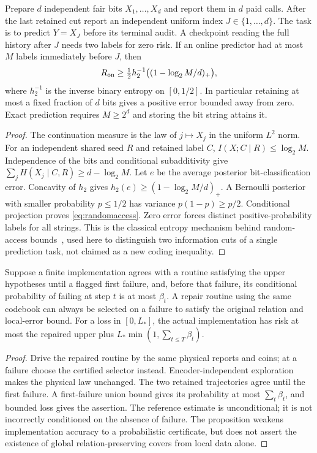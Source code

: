 \begin{example}\label{ex:query}
Prepare $d$ independent fair bits $X_1,\ldots,X_d$ and report them in $d$ paid calls. After the last retained cut report an independent uniform index $J\in\{1,\ldots,d\}$. The task is to predict $Y=X_J$ before its terminal audit. A checkpoint reading the full history after $J$ needs two labels for zero risk. If an online predictor had at most $M$ labels immediately before $J$, then
\begin{equation}\label{eq:randomaccess}
 R_{\mathrm{on}}\ge\tfrac12 h_2^{-1}\bigl((1-\log_2 M/d)_+\bigr),
\end{equation}
where $h_2^{-1}$ is the inverse binary entropy on $[0,1/2]$. In particular retaining at most a fixed fraction of $d$ bits gives a positive error bounded away from zero. Exact prediction requires $M\ge2^d$ and storing the bit string attains it.
\end{example}
\begin{proof}
The continuation measure is the law of $j\mapsto X_j$ in the uniform $L^2$ norm. For an independent shared seed $R$ and retained label $C$, $I(X;C\mid R)\le\log_2 M$. Independence of the bits and conditional subadditivity give
$\sum_j H(X_j\mid C,R)\ge d-\log_2M$.
Let $e$ be the average posterior bit-classification error. Concavity of $h_2$ gives $h_2(e)\ge(1-\log_2M/d)_+$. A Bernoulli posterior with smaller probability $p\le1/2$ has variance $p(1-p)\ge p/2$. Conditional projection proves \eqref{eq:randomaccess}. Zero error forces distinct positive-probability labels for all strings. This is the classical entropy mechanism behind random-access bounds~\cite{nayak}, used here to distinguish two information cuts of a single prediction task, not claimed as a new coding inequality.
\end{proof}

\begin{proposition}\label{prop:repair}
Suppose a finite implementation agrees with a routine satisfying the upper hypotheses until a flagged first failure, and, before that failure, its conditional probability of failing at step $t$ is at most $\beta_t$. A repair routine using the same codebook can always be selected on a failure to satisfy the original relation and local-error bound. For a loss in $[0,L_*]$, the actual implementation has risk at most the repaired upper plus $L_*\min(1,\sum_{t\le T}\beta_t)$.
\end{proposition}
\begin{proof}
Drive the repaired routine by the same physical reports and coins; at a failure choose the certified selector instead. Encoder-independent exploration makes the physical law unchanged. The two retained trajectories agree until the first failure. A first-failure union bound gives its probability at most $\sum_t\beta_t$, and bounded loss gives the assertion. The reference estimate is unconditional; it is not incorrectly conditioned on the absence of failure. The proposition weakens implementation accuracy to a probabilistic certificate, but does not assert the existence of global relation-preserving covers from local data alone.
\end{proof}
